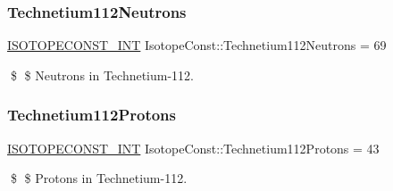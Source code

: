 \subsubsection{\texorpdfstring{Technetium112\+Neutrons}{Technetium112Neutrons}}
{\footnotesize\ttfamily \mbox{\hyperlink{group___isotope_const-_macros_ga5f18360b3e99483a35c32d789e62621c}{I\+S\+O\+T\+O\+P\+E\+C\+O\+N\+S\+T\+\_\+\+I\+NT}} Isotope\+Const\+::\+Technetium112\+Neutrons = 69}

\$ \$ Neutrons in Technetium-\/112. \mbox{\label{group___isotope_const-_technetium-_tc112_ga6c88f2668977e45fbfb0d5d6c266e2f3}} 
\subsubsection{\texorpdfstring{Technetium112\+Protons}{Technetium112Protons}}
{\footnotesize\ttfamily \mbox{\hyperlink{group___isotope_const-_macros_ga5f18360b3e99483a35c32d789e62621c}{I\+S\+O\+T\+O\+P\+E\+C\+O\+N\+S\+T\+\_\+\+I\+NT}} Isotope\+Const\+::\+Technetium112\+Protons = 43}

\$ \$ Protons in Technetium-\/112. 
